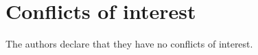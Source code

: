 \section{Conflicts of interest}\label{sec:coi}

The authors declare that they have no conflicts of interest.
